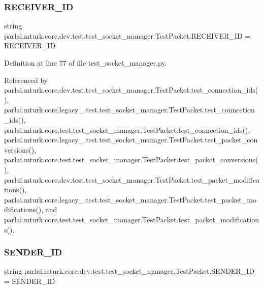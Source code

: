 \subsubsection{\texorpdfstring{R\+E\+C\+E\+I\+V\+E\+R\+\_\+\+ID}{RECEIVER\_ID}}
{\footnotesize\ttfamily string parlai.\+mturk.\+core.\+dev.\+test.\+test\+\_\+socket\+\_\+manager.\+Test\+Packet.\+R\+E\+C\+E\+I\+V\+E\+R\+\_\+\+ID = \textquotesingle{}R\+E\+C\+E\+I\+V\+E\+R\+\_\+\+ID\textquotesingle{}\hspace{0.3cm}{\ttfamily [static]}}



Definition at line 77 of file test\+\_\+socket\+\_\+manager.\+py.



Referenced by parlai.\+mturk.\+core.\+dev.\+test.\+test\+\_\+socket\+\_\+manager.\+Test\+Packet.\+test\+\_\+connection\+\_\+ids(), parlai.\+mturk.\+core.\+legacy\+\_.\+test.\+test\+\_\+socket\+\_\+manager.\+Test\+Packet.\+test\+\_\+connection\+\_\+ids(), parlai.\+mturk.\+core.\+test.\+test\+\_\+socket\+\_\+manager.\+Test\+Packet.\+test\+\_\+connection\+\_\+ids(), parlai.\+mturk.\+core.\+legacy\+\_.\+test.\+test\+\_\+socket\+\_\+manager.\+Test\+Packet.\+test\+\_\+packet\+\_\+conversions(), parlai.\+mturk.\+core.\+test.\+test\+\_\+socket\+\_\+manager.\+Test\+Packet.\+test\+\_\+packet\+\_\+conversions(), parlai.\+mturk.\+core.\+dev.\+test.\+test\+\_\+socket\+\_\+manager.\+Test\+Packet.\+test\+\_\+packet\+\_\+modifications(), parlai.\+mturk.\+core.\+legacy\+\_.\+test.\+test\+\_\+socket\+\_\+manager.\+Test\+Packet.\+test\+\_\+packet\+\_\+modifications(), and parlai.\+mturk.\+core.\+test.\+test\+\_\+socket\+\_\+manager.\+Test\+Packet.\+test\+\_\+packet\+\_\+modifications().

\mbox{\label{classparlai_1_1mturk_1_1core_1_1dev_1_1test_1_1test__socket__manager_1_1TestPacket_a5c366d5627096646234cd4349f27131a}} 
\subsubsection{\texorpdfstring{S\+E\+N\+D\+E\+R\+\_\+\+ID}{SENDER\_ID}}
{\footnotesize\ttfamily string parlai.\+mturk.\+core.\+dev.\+test.\+test\+\_\+socket\+\_\+manager.\+Test\+Packet.\+S\+E\+N\+D\+E\+R\+\_\+\+ID = \textquotesingle{}S\+E\+N\+D\+E\+R\+\_\+\+ID\textquotesingle{}\hspace{0.3cm}{\ttfamily [static]}}



